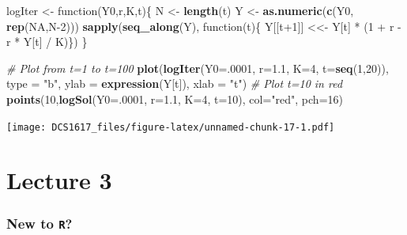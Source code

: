 \documentclass[]{book}
\newenvironment{Shaded}{\begin{snugshade}}{\end{snugshade}}
\newcommand{\KeywordTok}[1]{\textcolor[rgb]{0.13,0.29,0.53}{\textbf{{#1}}}}
\newcommand{\DataTypeTok}[1]{\textcolor[rgb]{0.13,0.29,0.53}{{#1}}}
\newcommand{\DecValTok}[1]{\textcolor[rgb]{0.00,0.00,0.81}{{#1}}}
\newcommand{\FloatTok}[1]{\textcolor[rgb]{0.00,0.00,0.81}{{#1}}}
\newcommand{\StringTok}[1]{\textcolor[rgb]{0.31,0.60,0.02}{{#1}}}
\newcommand{\CommentTok}[1]{\textcolor[rgb]{0.56,0.35,0.01}{\textit{{#1}}}}
\newcommand{\OtherTok}[1]{\textcolor[rgb]{0.56,0.35,0.01}{{#1}}}
\newcommand{\NormalTok}[1]{{#1}}
\begin{document}
\begin{Shaded}
\begin{Highlighting}[]
\NormalTok{logIter <-}\StringTok{  }\NormalTok{function(Y0,r,K,t)\{}
  \NormalTok{N <-}\StringTok{ }\KeywordTok{length}\NormalTok{(t)}
  \NormalTok{Y <-}\StringTok{ }\KeywordTok{as.numeric}\NormalTok{(}\KeywordTok{c}\NormalTok{(Y0, }\KeywordTok{rep}\NormalTok{(}\OtherTok{NA}\NormalTok{,N}\DecValTok{-2}\NormalTok{)))}
  \KeywordTok{sapply}\NormalTok{(}\KeywordTok{seq_along}\NormalTok{(Y), function(t)\{ Y[[t}\DecValTok{+1}\NormalTok{]] <<-}\StringTok{ }\NormalTok{Y[t] *}\StringTok{ }\NormalTok{(}\DecValTok{1} \NormalTok{+}\StringTok{ }\NormalTok{r -}\StringTok{ }\NormalTok{r *}\StringTok{ }\NormalTok{Y[t] /}\StringTok{ }\NormalTok{K)\})}
  \NormalTok{\}}

\CommentTok{# Plot from t=1 to t=100}
\KeywordTok{plot}\NormalTok{(}\KeywordTok{logIter}\NormalTok{(}\DataTypeTok{Y0=}\NormalTok{.}\DecValTok{0001}\NormalTok{, }\DataTypeTok{r=}\FloatTok{1.1}\NormalTok{, }\DataTypeTok{K=}\DecValTok{4}\NormalTok{, }\DataTypeTok{t=}\KeywordTok{seq}\NormalTok{(}\DecValTok{1}\NormalTok{,}\DecValTok{20}\NormalTok{)), }\DataTypeTok{type =} \StringTok{"b"}\NormalTok{, }
     \DataTypeTok{ylab =} \KeywordTok{expression}\NormalTok{(Y[t]), }\DataTypeTok{xlab =} \StringTok{"t"}\NormalTok{)}
\CommentTok{# Plot t=10 in red}
\KeywordTok{points}\NormalTok{(}\DecValTok{10}\NormalTok{,}\KeywordTok{logSol}\NormalTok{(}\DataTypeTok{Y0=}\NormalTok{.}\DecValTok{0001}\NormalTok{, }\DataTypeTok{r=}\FloatTok{1.1}\NormalTok{, }\DataTypeTok{K=}\DecValTok{4}\NormalTok{, }\DataTypeTok{t=}\DecValTok{10}\NormalTok{), }\DataTypeTok{col=}\StringTok{"red"}\NormalTok{, }\DataTypeTok{pch=}\DecValTok{16}\NormalTok{)}
\end{Highlighting}
\end{Shaded}

\texttt{[image: DCS1617\_files/figure-latex/unnamed-chunk-17-1.pdf]}

\chapter*{Lecture 3}\label{lecture-3}

\subsection*{\texorpdfstring{New to
\texttt{R}?}{New to R?}}\label{new-to-r}
\end{document}

